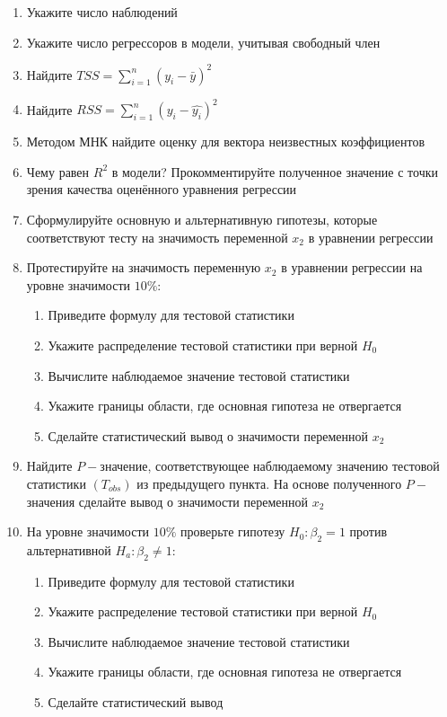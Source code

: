 \begin{problem}
\begin{enumerate}
\item Укажите число наблюдений
\item Укажите число регрессоров в модели, учитывая свободный член
\item Найдите $TSS = \sum_{i=1}^n (y_i - \bar y)^2$
\item Найдите $RSS = \sum_{i=1}^n (y_i - \hat{y_i})^2$
\item Методом МНК найдите оценку для вектора неизвестных коэффициентов
\item Чему равен $R^2$ в модели? Прокомментируйте полученное значение с точки зрения качества оценённого уравнения регрессии
\item Сформулируйте основную и альтернативную гипотезы, которые соответствуют тесту на значимость переменной $x_2$ в уравнении регрессии
\item Протестируйте на значимость переменную $x_2$ в уравнении регрессии на уровне значимости $10\%$:
\begin{enumerate}
\item Приведите формулу для тестовой статистики 
\item Укажите распределение тестовой статистики при верной $H_0$
\item Вычислите наблюдаемое значение тестовой статистики
\item Укажите границы области, где основная гипотеза не отвергается
\item Сделайте статистический вывод о значимости переменной $x_2$
\end{enumerate}
\item Найдите $P-$значение, соответствующее наблюдаемому значению тестовой статистики $(T_{obs})$ из предыдущего пункта. На основе полученного $P-$значения сделайте вывод о значимости переменной $x_2$
\item На уровне значимости $10\%$ проверьте гипотезу $H_0: \beta_2 = 1$ против альтернативной $H_a: \beta_2 \not= 1$:
\begin{enumerate}
\item Приведите формулу для тестовой статистики 
\item Укажите распределение тестовой статистики при верной $H_0$
\item Вычислите наблюдаемое значение тестовой статистики
\item Укажите границы области, где основная гипотеза не отвергается
\item Сделайте статистический вывод
\end{enumerate}

\end{enumerate}
\end{problem}
